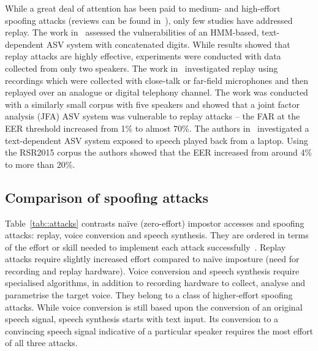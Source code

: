 While a great deal of attention has been paid to medium- and high-effort spoofing attacks (reviews can be found in~\cite{handbookChapter,Wu2014a}), only few studies have addressed replay.  
The work in~\cite{Lindberg1999} assessed the vulnerabilities of an HMM-based, text-dependent ASV system with concatenated digits.  
While results showed that replay attacks are highly effective, experiments were conducted with data collected from only two speakers.
The work in~\cite{Villalba2010} investigated replay using recordings which were collected with close-talk or far-field microphones and then replayed over an analogue or digital telephony channel. 
The work was conducted with a similarly small corpus with five speakers and showed that a joint factor analysis (JFA) ASV system was vulnerable to replay attacks -- the FAR at the EER threshold increased from 1\% to almost 70\%. The authors in~\cite{Wu2014} investigated a text-dependent ASV system exposed to speech played back from a laptop. Using the RSR2015 corpus the authors showed that the EER increased from around 4\% to more than 20\%.







\subsection{Comparison of spoofing attacks}
\label{sec::algorithms::comparison}


Table~\ref{tab::attacks} contrasts na\"{i}ve (zero-effort) impostor accesses and spoofing attacks: replay, voice conversion and speech synthesis.  
They are ordered in terms of the effort or skill needed to implement each attack successfully~\cite{Wu2014a}. 
Replay attacks require slightly increased effort compared to na\"{i}ve imposture (need for recording and replay hardware). 
Voice conversion and speech synthesis require specialised algorithms, in addition to recording hardware to collect, analyse and parametrise the target voice. 
They belong to a class of higher-effort spoofing attacks. 
While voice conversion is still based upon the conversion of an original speech signal, speech synthesis starts with text input. 
Its conversion to a convincing speech signal indicative of a particular speaker requires the most effort of all three attacks.

